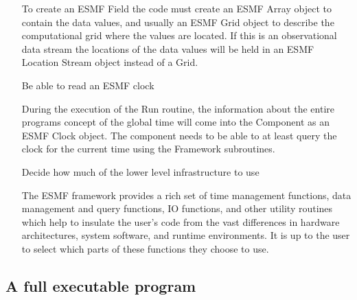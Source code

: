 \begin{enumerate}
To create an ESMF Field the code must create an ESMF Array object to
contain the data values, and usually an ESMF Grid object to describe the
computational grid where the values are located.  If this is an
observational data stream the locations of the data values will be held in
an ESMF Location Stream object instead of a Grid.

\item[Be able to read an ESMF clock]

During the execution of the Run routine, the information about the
entire programs concept of the global time will come into the Component
as an ESMF Clock object.  The component needs to be able to at least
query the clock for the current time using the Framework subroutines.

\item[Decide how much of the lower level infrastructure to use]

The ESMF framework provides a rich set of time management functions,
data management and query functions, IO functions, and other utility
routines which help to insulate the user's code from the vast differences
in hardware architectures, system software, and runtime environments.
It is up to the user to select which parts of these functions they
choose to use.

\end{enumerate}

\subsection{A full executable program}

